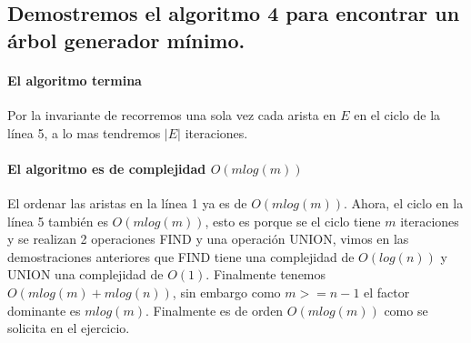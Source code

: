 \documentclass[12pt]{article}
\begin{document}
\subsection{Demostremos el algoritmo 4 para encontrar un árbol generador mínimo.}
\paragraph{El algoritmo termina}
Por la invariante de recorremos una sola vez cada arista en $E$ en el ciclo de la línea 5, a lo mas tendremos $|E|$ iteraciones.
\paragraph{El algoritmo es de complejidad $O(mlog(m))$}
El ordenar las aristas en la línea 1 ya es de $O(mlog(m))$. Ahora, el ciclo en la línea 5 también es $O(mlog(m))$, esto es porque se el ciclo tiene $m$ iteraciones y se realizan 2 operaciones FIND y una operación UNION, vimos en las demostraciones anteriores que FIND tiene una complejidad de $O(log(n))$ y UNION una complejidad de $O(1)$. Finalmente tenemos $O(mlog(m) + mlog(n))$, sin embargo como $m>=n-1$ el factor dominante es $mlog(m)$. Finalmente es de orden $O(mlog(m))$ como se solicita en el ejercicio.
\end{document}
